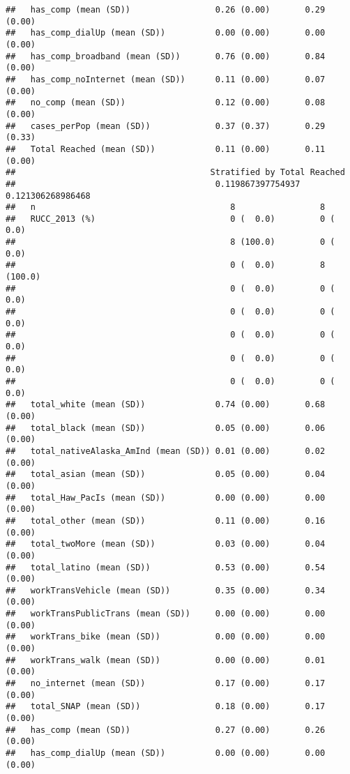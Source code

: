 \documentclass[
]{article}
\begin{document}
\begin{verbatim}
##   has_comp (mean (SD))                 0.26 (0.00)       0.29 (0.00)      
##   has_comp_dialUp (mean (SD))          0.00 (0.00)       0.00 (0.00)      
##   has_comp_broadband (mean (SD))       0.76 (0.00)       0.84 (0.00)      
##   has_comp_noInternet (mean (SD))      0.11 (0.00)       0.07 (0.00)      
##   no_comp (mean (SD))                  0.12 (0.00)       0.08 (0.00)      
##   cases_perPop (mean (SD))             0.37 (0.37)       0.29 (0.33)      
##   Total Reached (mean (SD))            0.11 (0.00)       0.11 (0.00)      
##                                       Stratified by Total Reached
##                                        0.119867397754937 0.121306268986468
##   n                                       8                 8             
##   RUCC_2013 (%)                           0 (  0.0)         0 (  0.0)     
##                                           8 (100.0)         0 (  0.0)     
##                                           0 (  0.0)         8 (100.0)     
##                                           0 (  0.0)         0 (  0.0)     
##                                           0 (  0.0)         0 (  0.0)     
##                                           0 (  0.0)         0 (  0.0)     
##                                           0 (  0.0)         0 (  0.0)     
##                                           0 (  0.0)         0 (  0.0)     
##   total_white (mean (SD))              0.74 (0.00)       0.68 (0.00)      
##   total_black (mean (SD))              0.05 (0.00)       0.06 (0.00)      
##   total_nativeAlaska_AmInd (mean (SD)) 0.01 (0.00)       0.02 (0.00)      
##   total_asian (mean (SD))              0.05 (0.00)       0.04 (0.00)      
##   total_Haw_PacIs (mean (SD))          0.00 (0.00)       0.00 (0.00)      
##   total_other (mean (SD))              0.11 (0.00)       0.16 (0.00)      
##   total_twoMore (mean (SD))            0.03 (0.00)       0.04 (0.00)      
##   total_latino (mean (SD))             0.53 (0.00)       0.54 (0.00)      
##   workTransVehicle (mean (SD))         0.35 (0.00)       0.34 (0.00)      
##   workTransPublicTrans (mean (SD))     0.00 (0.00)       0.00 (0.00)      
##   workTrans_bike (mean (SD))           0.00 (0.00)       0.00 (0.00)      
##   workTrans_walk (mean (SD))           0.00 (0.00)       0.01 (0.00)      
##   no_internet (mean (SD))              0.17 (0.00)       0.17 (0.00)      
##   total_SNAP (mean (SD))               0.18 (0.00)       0.17 (0.00)      
##   has_comp (mean (SD))                 0.27 (0.00)       0.26 (0.00)      
##   has_comp_dialUp (mean (SD))          0.00 (0.00)       0.00 (0.00)      

\end{verbatim}
\end{document}
